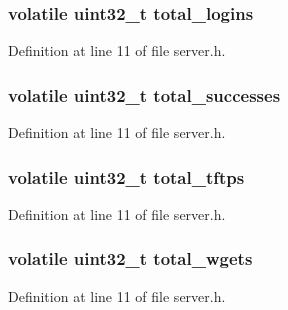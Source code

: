 \subsubsection[{\texorpdfstring{total\+\_\+logins}{total_logins}}]{\setlength{\rightskip}{0pt plus 5cm}volatile uint32\+\_\+t total\+\_\+logins}\hypertarget{structserver_a775d7dfa5b4752f9de7d4b1a4f848562}{}\label{structserver_a775d7dfa5b4752f9de7d4b1a4f848562}


Definition at line 11 of file server.\+h.

\subsubsection[{\texorpdfstring{total\+\_\+successes}{total_successes}}]{\setlength{\rightskip}{0pt plus 5cm}volatile uint32\+\_\+t total\+\_\+successes}\hypertarget{structserver_a4077e0ba638cb87bfaa0412929cd8cf6}{}\label{structserver_a4077e0ba638cb87bfaa0412929cd8cf6}


Definition at line 11 of file server.\+h.

\subsubsection[{\texorpdfstring{total\+\_\+tftps}{total_tftps}}]{\setlength{\rightskip}{0pt plus 5cm}volatile uint32\+\_\+t total\+\_\+tftps}\hypertarget{structserver_a366af7f3a5ea2f51a94717763cc60533}{}\label{structserver_a366af7f3a5ea2f51a94717763cc60533}


Definition at line 11 of file server.\+h.

\subsubsection[{\texorpdfstring{total\+\_\+wgets}{total_wgets}}]{\setlength{\rightskip}{0pt plus 5cm}volatile uint32\+\_\+t total\+\_\+wgets}\hypertarget{structserver_aba6bc4241f091f9fe65a221e47fcae4f}{}\label{structserver_aba6bc4241f091f9fe65a221e47fcae4f}


Definition at line 11 of file server.\+h.

